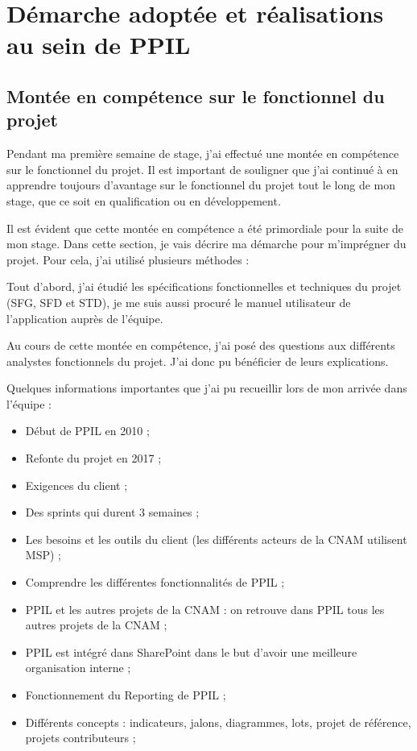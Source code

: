 \chapter{Démarche adoptée et réalisations au sein de PPIL}
\label{chap:premierchapitre}


\section{Montée en compétence sur le fonctionnel du projet}

Pendant ma première semaine de stage, j'ai effectué une montée en compétence sur le fonctionnel du projet. Il est important de souligner que j'ai continué à en apprendre toujours d'avantage sur le fonctionnel du projet tout le long de mon stage, que ce soit en qualification ou en développement.

Il est évident que cette montée en compétence a été primordiale pour la suite de mon stage. Dans cette section, je vais décrire ma démarche pour m'imprégner du projet. Pour cela, j'ai utilisé plusieurs méthodes :

Tout d'abord, j'ai étudié les spécifications fonctionnelles et techniques du projet (SFG, SFD et STD), je me suis aussi procuré le manuel utilisateur de l'application auprès de l'équipe.

Au cours de cette montée en compétence, j'ai posé des questions aux différents analystes fonctionnels du projet. J'ai donc pu bénéficier de leurs explications.

Quelques informations importantes que j'ai pu recueillir lors de mon arrivée dans l'équipe :
\begin{itemize}
    \item Début de PPIL en 2010 ;
    \item Refonte du projet en 2017 ;
    \item Exigences du client ;
    \item Des sprints qui durent 3 semaines ;
    \item Les besoins et les outils du client (les différents acteurs de la CNAM utilisent MSP) ;
    \item Comprendre les différentes fonctionnalités de PPIL ;
    \item PPIL et les autres projets de la CNAM : on retrouve dans PPIL tous les autres projets de la CNAM ;
    \item PPIL est intégré dans SharePoint dans le but d'avoir une meilleure organisation interne ;
    \item Fonctionnement du Reporting de PPIL ;
    \item Différents concepts : indicateurs, jalons, diagrammes, lots, projet de référence, projets contributeurs ; 
\end{itemize}


